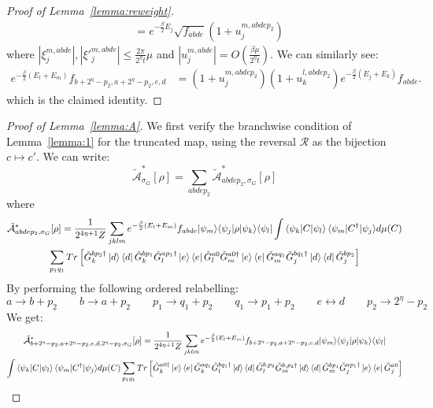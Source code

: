 \documentclass[aps,floatfix,10pt,amssymb,amsfont,amsmath,superscriptaddress,float,nofootinbib,longbibliography,nobalancelastpage,twocolumn]{revtex4-2}
\begin{document}
\begin{proof}[Proof of Lemma~\ref{lemma:reweight}]
\begin{equation}
\begin{aligned}
    &= e^{-\frac{\beta}{2}E_j}\sqrt{f_{abde}}(1+u^{m,abdep_2}_j)
\end{aligned}
\end{equation}
where $|\xi^{m,abde}_j|,|\xi'^{m,abde}_j| \leq \frac{2\pi}{2^{\eta}t}\mu$
and $|u^{m,abde}_j| = O(\frac{\beta \mu}{2^{\eta}t})$. We can similarly see:
\begin{equation}
\begin{aligned}
e^{-\frac{\beta}{2}(E_l+E_m)}f_{b+2^{\eta}-p_2,a+2^{\eta}-p_2,e,d}
&=(1+u_j^{m,abdep_2})(1+u_k^{l,abdep_2})e^{-\frac{\beta}{2}(E_j+E_k)}f_{abde}.
\end{aligned}
\label{eq:fabtofba}
\end{equation}
which is the claimed identity.
\end{proof}
\begin{proof}[Proof of Lemma~\ref{lemma:A}]
We first verify the branchwise condition of Lemma~\ref{lemma:1} for the truncated map, using the reversal $\mathcal{R}$ as the bijection $c \mapsto c'$.
We can write:
\begin{equation}
    \tilde{\mathcal{A}}^*_{\sigma_G}[\rho] =  \sum_{abdep_2}\tilde{\mathcal{A}}^*_{abdep_2,\sigma_G}[\rho]
\end{equation}
where 
\begin{multline}
  \tilde{\mathcal{A}}^*_{abdep_2,\sigma_G}[\rho] = \frac{1}{2^{4\eta+1}Z} \sum_{jklm}  e^{-\frac{\beta}{2}(E_l+E_m)}{f_{abde}} {\ket{\psi_m}}{\bra{\psi_j}}\rho{\ket{\psi_k}}{\bra{\psi_l}} \int {\braket{\psi_k|C|\psi_l}\braket{\psi_m|C^{\dagger}|\psi_j}} d\mu(C)\\\sum_{p_1q_1}Tr\left[ {\tilde G^{bp_2\dagger}_k\ket{d}\bra{d}\tilde G^{bp_1}_k} {\tilde G_l^{ap_1\dagger}\ket{e}\bra{e}\tilde G_l^{a0}\tilde G_m^{a0\dagger}\ket{e}\bra{e}\tilde G_m^{aq_1}} {\tilde G^{bq_1\dagger}_j\ket{d}\bra{d}\tilde G^{bp_2}_j } \right]
\end{multline}
By performing the following ordered relabelling:
\begin{equation}
    a \rightarrow b+p_2 \qquad b\rightarrow a+p_2 \qquad p_1 \rightarrow q_1+ p_2 \qquad q_1 \rightarrow p_1 + p_2 \qquad e \leftrightarrow d \qquad p_2 \rightarrow 2^{\eta}-p_2
\end{equation}
We get:
\begin{multline}
  \tilde{\mathcal{A}}^*_{b+2^{\eta}-p_2,a+2^{\eta}-p_2,e,d,2^{\eta}-p_2,\sigma_G}[\rho] = \frac{1}{2^{4\eta+1}Z} \sum_{jklm}  e^{-\frac{\beta}{2}(E_l+E_m)}{f_{b+2^{\eta}-p_2,a+2^{\eta}-p_2,e,d}} {\ket{\psi_m}}{\bra{\psi_j}}\rho{\ket{\psi_k}}{\bra{\psi_l}} \\\int {\braket{\psi_k|C|\psi_l}\braket{\psi_m|C^{\dagger}|\psi_j}} d\mu(C)\sum_{p_1q_1} Tr\left[{\tilde G^{a0\dagger}_k\ket{e}\bra{e}\tilde G^{aq_1}_k} {\tilde G_l^{bq_1\dagger}\ket{d}\bra{d}\tilde G_l^{b,p_2}\tilde G_m^{b, p_2\dagger}\ket{d}\bra{d}\tilde G_m^{bp_1}} {\tilde G^{ap_1\dagger}_j\ket{e}\bra{e}\tilde G^{a0}_j } \right]

\end{multline}
\end{proof}
\end{document}
